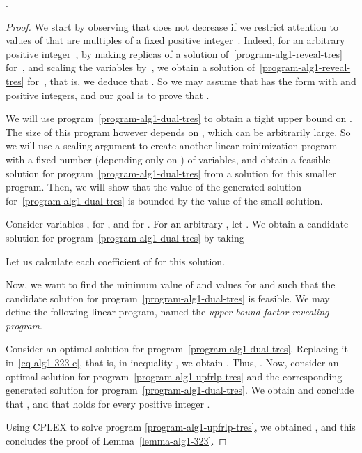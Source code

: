 \newcommand{\PasteLemmaAlgOneThreeTwoThree}{
.
}
\begin{lemma}\label{lemma-alg1-323}
\PasteLemmaAlgOneThreeTwoThree
\end{lemma}
\begin{proof}
  We start by observing that  does not decrease if
  we restrict attention to values of  that are multiples of a fixed
  positive integer~. Indeed, for an arbitrary positive integer~, by
  making  replicas of a solution of~\eqref{program-alg1-reveal-tres}
  for~, and scaling the variables by~, we obtain a solution
  of~\eqref{program-alg1-reveal-tres} for~, that is, we deduce that
  . So we may assume that  has the form  with  and  positive integers, and our goal is to prove that 
  .

  We will use program~\eqref{program-alg1-dual-tres} to obtain a tight
  upper bound on . The size of this program however
  depends on , which can be arbitrarily large. So we will use a
  scaling argument to create another linear minimization program with
  a fixed number (depending only on ) of variables, and obtain a
  feasible solution for program~\eqref{program-alg1-dual-tres} from a
  solution for this smaller program. Then, we will show that the value
  of the generated solution for~\eqref{program-alg1-dual-tres} is
  bounded by the value of the small solution.

  Consider variables ,  for , and  for . For
  an arbitrary , let . We obtain a
  candidate solution for program~\eqref{program-alg1-dual-tres} by taking


Let us calculate each coefficient of  for this solution.







Now, we want to find the minimum value of  and values for  and
 such that the candidate solution for program~\eqref{program-alg1-dual-tres}
is feasible. We may define the following linear program,
named the \emph{upper bound factor-revealing program}.


Consider an optimal solution for program~\eqref{program-alg1-dual-tres}.
Replacing it in~\eqref{eq-alg1-323-c}, that is, in inequality , we obtain
. Thus,
. Now, consider an optimal solution for
program~\eqref{program-alg1-upfrlp-tres} and the corresponding generated
solution for program~\eqref{program-alg1-dual-tres}. We obtain  and conclude that , 
and that holds for every positive integer .

Using CPLEX to solve program \eqref{program-alg1-upfrlp-tres}, we obtained
\MAGIC{}, and this concludes the proof
of Lemma~\ref{lemma-alg1-323}.
\end{proof}
 






